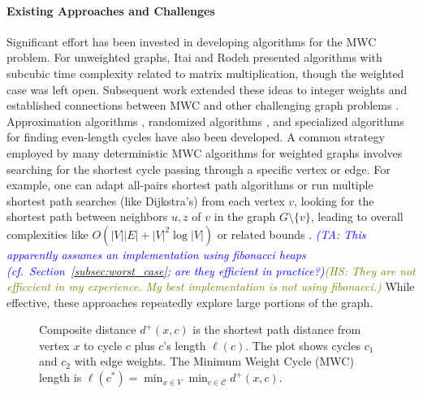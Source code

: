 \documentclass{article}
\newcommand{\ta}[1]{\textcolor{blue}{\textit{(TA: {#1})}}}
\newcommand{\hs}[1]{\textcolor{olive}{\textit{(HS: {#1})}}}
\begin{document}
\paragraph{Existing Approaches and Challenges}
Significant effort has been invested in developing algorithms for the MWC problem. For unweighted graphs, Itai and Rodeh \cite{itai1978finding} presented algorithms with subcubic time complexity related to matrix multiplication, though the weighted case was left open. Subsequent work extended these ideas to integer weights \cite{roditty2011minimum} and established connections between MWC and other challenging graph problems \cite{williams2010subcubic}. Approximation algorithms \cite{itai1978finding, Roditty20111446, lingas2009efficient, yuster2011shortest, peleg2012distributed}, randomized algorithms \cite{yuster2011shortest}, and specialized algorithms for finding even-length cycles \cite{yuster1997finding} have also been developed.
A common strategy employed by many deterministic MWC algorithms for weighted graphs involves searching for the shortest cycle passing through a specific vertex or edge. For example, one can adapt all-pairs shortest path algorithms or run multiple shortest path searches (like Dijkstra's) from each vertex $v$, looking for the shortest path between neighbors $u, z$ of $v$ in the graph $G \setminus \{v\}$, leading to overall complexities like $O(|V||E| + |V|^2 \log |V|)$ or related bounds \cite{itai1978finding, yuster2011shortest, orlin2016nm}. 
\ta{This apparently assumes an implementation using fibonacci heaps (cf.~Section~\ref{subsec:worst_case}; are they efficient in practice?}\hs{They are not efficcient in my experience. My best implementation is not using fibonacci.}
While effective, these approaches repeatedly explore large portions of the graph.



\begin{wrapfigure}[21]{r}{0.4\textwidth}
\vspace{-14pt}
	\centering
    \resizebox{0.4\textwidth}{!}{}
    \vspace{-13pt}
	\caption{Composite distance  $d^+(x,c)$ is the shortest path distance from vertex $x$ to cycle $c$ plus $c$'s length $\ell(c)$. The plot shows cycles $c_1$ and $c_2$ with edge weights. The Minimum Weight Cycle (MWC) length is $\ell(c^*) = \min_{x \in V} \min_{c \in \mathscr{C}} d^+(x,c)$.}
    \label{fig:composite_distance}
\end{wrapfigure}
\end{document}
